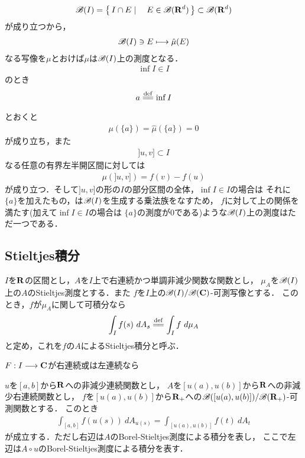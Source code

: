 	\begin{align}
		\mathscr{B}(I) = \left\{\, I \cap E \mid \quad E \in \mathscr{B}(\mathbf{R}^d)\, \right\} \subset \mathscr{B}(\mathbf{R}^d)
	\end{align}
	が成り立つから，
	\begin{align}
		\mathscr{B}(I) \ni E \longmapsto \hat{\mu}(E)
	\end{align}
	なる写像を$\mu$とおけば$\mu$は$\mathscr{B}(I)$上の測度となる．
	\begin{align}
		\inf{}{I} \in I
	\end{align}
	のとき
	\begin{align}
		a \defeq \inf{}{I}
	\end{align}
	とおくと
	\begin{align}
		\mu(\{a\}) = \hat{\mu}(\{a\}) = 0
	\end{align}
	が成り立ち，また
	\begin{align}
		]u,v] \subset I
	\end{align}
	なる任意の有界左半開区間に対しては
	\begin{align}
		\mu(]u,v]) = f(v) - f(u)
	\end{align}
	が成り立つ．そして$]u,v]$の形の$I$の部分区間の全体，$\inf{}{I} \in I$の場合は
	それに$\{a\}$を加えたもの，は$\mathscr{B}(I)$を生成する乗法族をなすため，
	$f$に対して上の関係を満たす(加えて$\inf{}{I} \in I$の場合は
	$\{a\}$の測度が$0$である)ような$\mathscr{B}(I)$上の測度はただ一つである．

\subsection{Stieltjes積分}
	$I$を$\mathbf{R}$の区間とし，$A$を$I$上で右連続かつ単調非減少関数な関数とし，
	$\mu_A$を$\mathscr{B}(I)$上の$A$のStieltjes測度とする．また
	$f$を$I$上の$\mathscr{B}(I)/\mathscr{B}(\mathbf{C})$-可測写像とする．
	このとき，$f$が$\mu_A$に関して可積分なら
	\begin{align}
		\int_I f(s)\ dA_s \defeq \int_I f\ d\mu_A
	\end{align}
	と定め，これを$f$の$A$によるStieltjes積分と呼ぶ．
	
	\begin{screen}
		\begin{thm}
			$F:I \longrightarrow \mathbf{C}$が右連続或は左連続なら
		\end{thm}
	\end{screen}
	
	\begin{screen}
		\begin{thm}[時間変更]
			$u$を$[a,b]$から$\mathbf{R}$への非減少連続関数とし，
			$A$を$[u(a),u(b)]$から$\mathbf{R}$への非減少右連続関数とし，
			$f$を$[u(a),u(b)]$から$\mathbf{R}_+$への$\mathscr{B}([u(a),u(b)])/\mathscr{B}(\mathbf{R}_+)$-可測関数とする．
			このとき
			\begin{align}
				\int_{[a,b]} f(u(s))\ dA_{u(s)} = \int_{[u(a),u(b)]} f(t)\ dA_t
			\end{align}
			が成立する．ただし右辺は$A$のBorel-Stieltjes測度による積分を表し，
			ここで左辺は$A \circ u$のBorel-Stieltjes測度による積分を表す．
		\end{thm}
	\end{screen}
	

